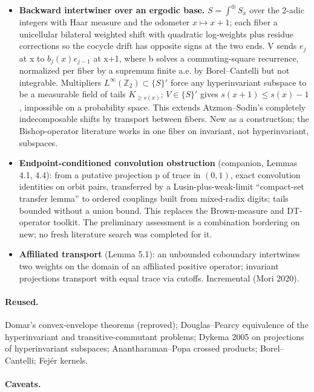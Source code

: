 \documentclass[11pt]{article}
\begin{document}
\begin{itemize}
\item \textbf{Backward intertwiner over an ergodic base.} $S=\int^\oplus S_x$ over the 2-adic integers with Haar measure and the odometer $x\mapsto x+1$; each fiber a unicellular bilateral weighted shift with quadratic log-weights plus residue corrections so the cocycle drift has opposite signs at the two ends. V sends $e_j$ at x to $b_j(x)e_{j-1}$ at x+1, where b solves a commuting-square recurrence, normalized per fiber by a supremum finite a.e. by Borel--Cantelli but not integrable. Multipliers $L^\infty(\mathbb Z_2)\subset\{S\}'$ force any hyperinvariant subspace to be a measurable field of tails $K_{\ge s(x)}$; $V\in\{S\}'$ gives $s(x+1)\le s(x)-1$, impossible on a probability space. This extends Atzmon--Sodin's completely indecomposable shifts by transport between fibers. New as a construction; the Bishop-operator literature works in one fiber on invariant, not hyperinvariant, subspaces.
\item \textbf{Endpoint-conditioned convolution obstruction} (companion, Lemmas 4.1, 4.4): from a putative projection p of trace in $(0,1)$, exact convolution identities on orbit pairs, transferred by a Lusin-plus-weak-limit ``compact-set transfer lemma'' to ordered couplings built from mixed-radix digits; tails bounded without a union bound. This replaces the Brown-measure and DT-operator toolkit. The preliminary assessment is a combination bordering on new; no fresh literature search was completed for it.
\item \textbf{Affiliated transport} (Lemma 5.1): an unbounded coboundary intertwines two weights on the domain of an affiliated positive operator; invariant projections transport with equal trace via cutoffs. Incremental (Mori 2020).
\end{itemize}

\paragraph{Reused.}

Domar's convex-envelope theorems (reproved); Douglas--Pearcy equivalence of the hyperinvariant and transitive-commutant problems; Dykema 2005 on projections of hyperinvariant subspaces; Anantharaman--Popa crossed products; Borel--Cantelli; Fejér kernels.

\paragraph{Caveats.}
\end{document}

